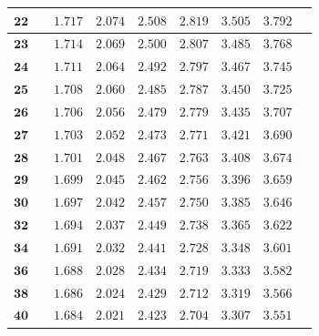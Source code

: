 \begin{customTableWrapper}{1.3}
\begin{longtable}{|l|l l|l|l|l|l|l|l|}
    $\mathbf{22}$ & & ${1.717}$   & ${2.074}$   & ${2.508}$   & ${2.819}$   & ${3.505}$   & ${3.792}$   \\ \hline
    
    $\mathbf{23}$ & & ${1.714}$   & ${2.069}$   & ${2.500}$   & ${2.807}$   & ${3.485}$   & ${3.768}$   \\ \hline
    
    $\mathbf{24}$ & & ${1.711}$   & ${2.064}$   & ${2.492}$   & ${2.797}$   & ${3.467}$   & ${3.745}$   \\ \hline
    
    $\mathbf{25}$ & & ${1.708}$   & ${2.060}$   & ${2.485}$   & ${2.787}$   & ${3.450}$   & ${3.725}$   \\ \hline
    
    $\mathbf{26}$ & & ${1.706}$   & ${2.056}$   & ${2.479}$   & ${2.779}$   & ${3.435}$   & ${3.707}$   \\ \hline
    
    $\mathbf{27}$ & & ${1.703}$   & ${2.052}$   & ${2.473}$   & ${2.771}$   & ${3.421}$   & ${3.690}$   \\ \hline
    
    $\mathbf{28}$ & & ${1.701}$   & ${2.048}$   & ${2.467}$   & ${2.763}$   & ${3.408}$   & ${3.674}$   \\ \hline
    
    $\mathbf{29}$ & & ${1.699}$   & ${2.045}$   & ${2.462}$   & ${2.756}$   & ${3.396}$   & ${3.659}$   \\ \hline
    
    $\mathbf{30}$ & & ${1.697}$   & ${2.042}$   & ${2.457}$   & ${2.750}$   & ${3.385}$   & ${3.646}$   \\ \hline
    
    $\mathbf{32}$ & & ${1.694}$   & ${2.037}$   & ${2.449}$   & ${2.738}$   & ${3.365}$   & ${3.622}$   \\ \hline
    
    $\mathbf{34}$ & & ${1.691}$   & ${2.032}$   & ${2.441}$   & ${2.728}$   & ${3.348}$   & ${3.601}$   \\ \hline
    
    $\mathbf{36}$ & & ${1.688}$   & ${2.028}$   & ${2.434}$   & ${2.719}$   & ${3.333}$   & ${3.582}$   \\ \hline
    
    $\mathbf{38}$ & & ${1.686}$   & ${2.024}$   & ${2.429}$   & ${2.712}$   & ${3.319}$   & ${3.566}$   \\ \hline
    
    $\mathbf{40}$ & & ${1.684}$   & ${2.021}$   & ${2.423}$   & ${2.704}$   & ${3.307}$   & ${3.551}$   \\ \hline
    

\end{longtable}
\end{customTableWrapper}
